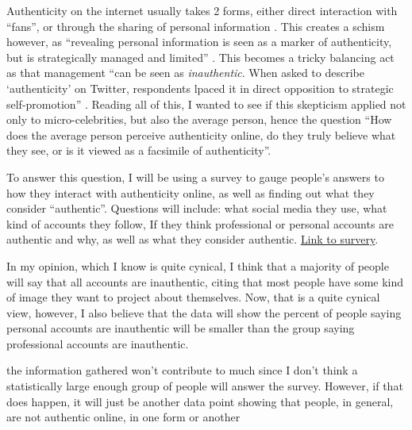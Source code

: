 \documentclass[12pt]{article}
\begin{document}
\begin{doublespace}
    Authenticity on the internet usually takes 2 forms, either direct interaction with ``fans'', or through the sharing of personal information \autocite[114]{Marwick1}.
    This creates a schism however, as ``revealing personal information is seen as a marker of authenticity, but is strategically managed and limited'' \autocite[127]{MB1}.
    This becomes a tricky balancing act as that management ``can be seen as \textit{inauthentic}. When asked to describe `authenticity' on Twitter, respondents lpaced it in direct opposition to strategic self-promotion'' \autocite[127]{MB1}.
    Reading all of this, I wanted to see if this skepticism applied not only to micro-celebrities, but also the average person, hence the question ``How does the average person perceive authenticity online, do they truly believe what
    they see, or is it viewed as a facsimile of authenticity''.
\par To answer this question, I will be using a survey to gauge people's answers to how they interact with authenticity online, as well as finding out what they consider ``authentic''.
    Questions will include: what social media they use, what kind of accounts they follow, If they think professional or personal accounts are authentic and why, as well as what they consider authentic.
    \underline{\href{https://forms.gle/sjiDcxBzhiiDFehy5}{Link to survery}}.
\par In my opinion, which I know is quite cynical, I think that a majority of people will say that all accounts are inauthentic, citing that most people have some kind of image they want to project about themselves.
    Now, that is a quite cynical view, however, I also believe that the data will show the percent of people saying personal accounts are inauthentic will be smaller than the group saying professional accounts are inauthentic.
\par the information gathered won't contribute to much since I don't think a statistically large enough group of people will answer the survey. 
    However, if that does happen, it will just be another data point showing that people, in general, are not authentic online, in one form or another



\newpage \printbibliography
\end{doublespace}
\end{document}
